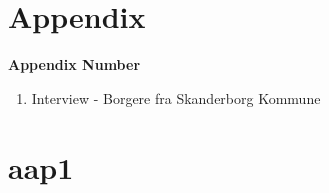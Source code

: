 \chapter{Appendix}

\textbf{Appendix Number}
\begin{enumerate}
	\item Interview - Borgere fra Skanderborg
Kommune
\end{enumerate}



\chapter{aap1}